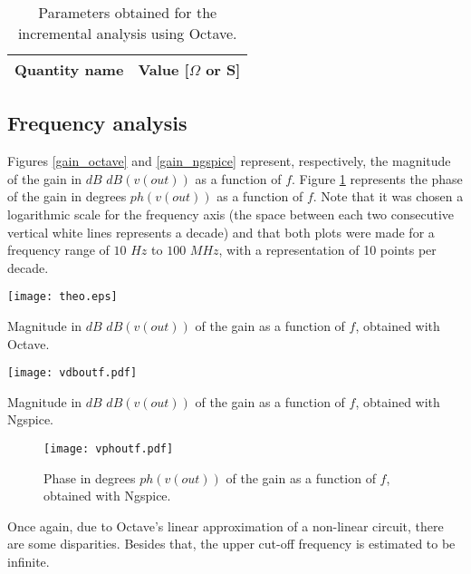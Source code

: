 \renewcommand{\arraystretch}{1.5}
\begin{table}[htbp]
\centering
\begin{tabular}{|c|c|}
\hline    
\textbf{Quantity name} & \textbf{Value [$\Omega$ or S]} \\ \hline

\end{tabular}
\caption{Parameters obtained for the incremental analysis using  Octave.}
\label{tab_i}
\end{table}



\vspace{5mm}
\subsection{Frequency analysis}

\vspace{3mm}
\par Figures \ref{gain_octave} and \ref{gain_ngspice} represent, respectively, the magnitude of the gain in $dB$ $dB(v(out))$ as a function of $f$. Figure \ref{phase_ngspice} represents the phase of the gain in degrees $ph(v(out))$ as a function of $f$. Note that it was chosen a logarithmic scale for the frequency axis (the space between each two consecutive vertical white lines represents a decade) and that both plots were made for a frequency range of $10$ $Hz$ to $100$ $MHz$, with a representation of 10 points per decade.


\begin{minipage}[b]{0.48\textwidth}
\centering
\texttt{[image: theo.eps]}
\captionsetup{type=figure}
\caption{Magnitude in $dB$ $dB(v(out))$ of the gain as a function of $f$, obtained with Octave.}
\label{gain_octave}
\end{minipage}
\begin{minipage}[b]{0.48\textwidth}
\centering
\texttt{[image: vdboutf.pdf]}
\captionsetup{type=figure}
\caption{Magnitude in $dB$ $dB(v(out))$ of the gain as a function of $f$, obtained with Ngspice.}
\label{gain_ngspice}
\end{minipage} 

\begin{figure}[h] \centering
\texttt{[image: vphoutf.pdf]}
\caption{Phase in degrees $ph(v(out))$ of the gain as a function of $f$, obtained with Ngspice.}
\label{phase_ngspice}
\end{figure}

\par Once again, due to Octave's linear approximation of a non-linear circuit, there are some disparities. Besides that, the upper cut-off frequency is estimated to be infinite.


